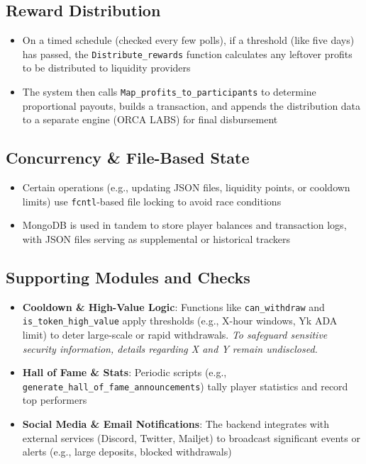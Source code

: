 \documentclass[11pt,a4paper]{report}
\begin{document}
\subsection{Reward Distribution}
\begin{itemize}
    \item On a timed schedule (checked every few polls), if a threshold (like five days) has passed, the \texttt{Distribute\_rewards} function calculates any leftover profits to be distributed to liquidity providers
    \item The system then calls \texttt{Map\_profits\_to\_participants} to determine proportional payouts, builds a transaction, and appends the distribution data to a separate engine (ORCA LABS) for final disbursement
\end{itemize}

\subsection{Concurrency \& File-Based State}
\begin{itemize}
    \item Certain operations (e.g., updating JSON files, liquidity points, or cooldown limits) use \texttt{fcntl}-based file locking to avoid race conditions
    \item MongoDB is used in tandem to store player balances and transaction logs, with JSON files serving as supplemental or historical trackers
\end{itemize}

\subsection{Supporting Modules and Checks}
\begin{itemize}
    \item \textbf{Cooldown \& High-Value Logic}: Functions like \texttt{can\_withdraw} and \texttt{is\_token\_high\_value} apply thresholds (e.g., X-hour windows, Yk ADA limit) to deter large-scale or rapid withdrawals. \textit{To safeguard sensitive security information, details regarding X and Y remain undisclosed.}
    \item \textbf{Hall of Fame \& Stats}: Periodic scripts (e.g., \texttt{generate\_hall\_of\_fame\_announcements}) tally player statistics and record top performers
    \item \textbf{Social Media \& Email Notifications}: The backend integrates with external services (Discord, Twitter, Mailjet) to broadcast significant events or alerts (e.g., large deposits, blocked withdrawals)
\end{itemize}
\end{document}
